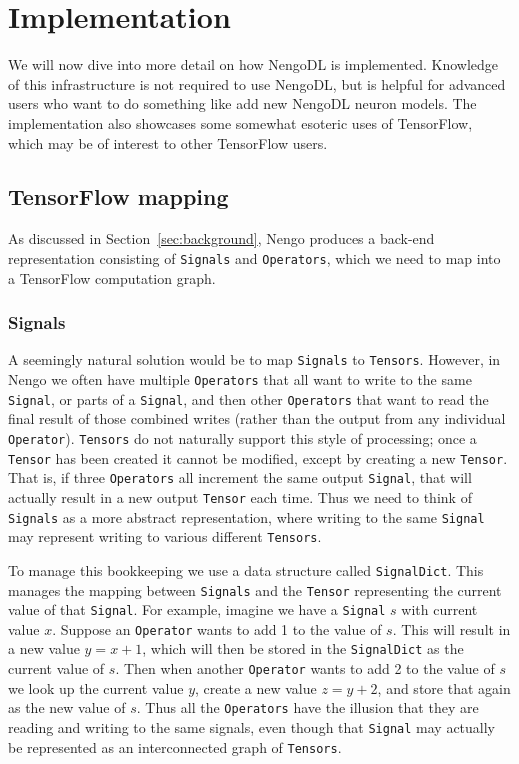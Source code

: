 \documentclass{article}
\begin{document}
\section{Implementation}

We will now dive into more detail on how NengoDL is implemented.  Knowledge of this infrastructure is not required to use NengoDL, but is helpful for advanced users who want to do something like add new NengoDL neuron models.  The implementation also showcases some somewhat esoteric uses of TensorFlow, which may be of interest to other TensorFlow users.

\subsection{TensorFlow mapping}

As discussed in Section~\ref{sec:background}, Nengo produces a back-end representation consisting of \texttt{Signals} and \texttt{Operators}, which we need to map into a TensorFlow computation graph.

\subsubsection{Signals}

A seemingly natural solution would be to map \texttt{Signals} to \texttt{Tensors}.  However, in Nengo we often have multiple \texttt{Operators} that all want to write to the same \texttt{Signal}, or parts of a \texttt{Signal}, and then other \texttt{Operators} that want to read the final result of those combined writes (rather than the output from any individual \texttt{Operator}).  \texttt{Tensors} do not naturally support this style of processing; once a \texttt{Tensor} has been created it cannot be modified, except by creating a new \texttt{Tensor}.  That is, if three \texttt{Operators} all increment the same output \texttt{Signal}, that will actually result in a new output \texttt{Tensor} each time.  Thus we need to think of \texttt{Signals} as a more abstract representation, where writing to the same \texttt{Signal} may represent writing to various different \texttt{Tensors}.

To manage this bookkeeping we use a data structure called \texttt{SignalDict}.  This manages the mapping between \texttt{Signals} and the \texttt{Tensor} representing the current value of that \texttt{Signal}.  For example, imagine we have a \texttt{Signal} $s$ with current value $x$.  Suppose an \texttt{Operator} wants to add 1 to the value of $s$.  This will result in a new value $y = x + 1$, which will then be stored in the \texttt{SignalDict} as the current value of $s$.  Then when another \texttt{Operator} wants to add 2 to the value of $s$ we look up the current value $y$, create a new value $z = y + 2$, and store that again as the new value of $s$.  Thus all the \texttt{Operators} have the illusion that they are reading and writing to the same signals, even though that \texttt{Signal} may actually be represented as an interconnected graph of \texttt{Tensors}.
\end{document}
